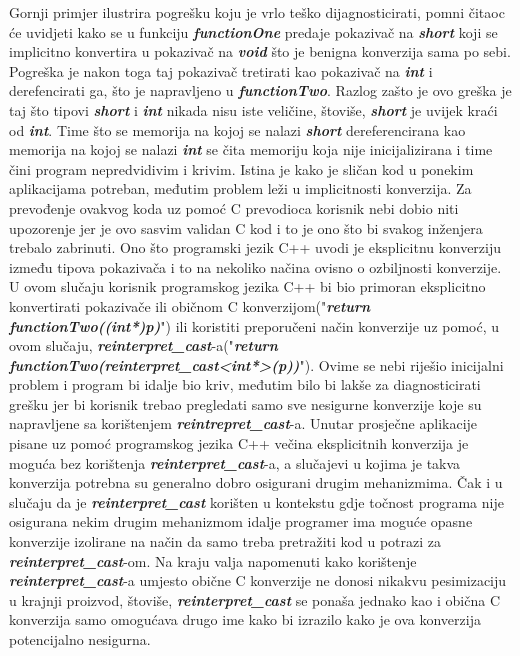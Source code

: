 Gornji primjer ilustrira pogrešku koju je vrlo teško dijagnosticirati, pomni čitaoc će uvidjeti kako se u funkciju \textbf{\textit{functionOne}} predaje pokazivač na \textbf{\textit{short}} koji se implicitno konvertira u pokazivač na \textbf{\textit{void}} što je benigna konverzija sama po sebi. Pogreška je nakon toga taj pokazivač tretirati kao pokazivač na \textbf{\textit{int}} i derefencirati ga, što je napravljeno u \textbf{\textit{functionTwo}}. Razlog zašto je ovo greška je taj što tipovi \textbf{\textit{short}} i \textbf{\textit{int}} nikada nisu iste veličine, štoviše, \textbf{\textit{short}} je uvijek kraći od \textbf{\textit{int}}. Time što se memorija na kojoj se nalazi \textbf{\textit{short}} dereferencirana kao memorija na kojoj se nalazi \textbf{\textit{int}} se čita memoriju koja nije inicijalizirana i time čini program nepredvidivim i krivim. Istina je kako je sličan kod u ponekim aplikacijama potreban, međutim problem leži u implicitnosti konverzija. Za prevođenje ovakvog koda uz pomoć C prevodioca korisnik nebi dobio niti upozorenje jer je ovo sasvim validan C kod i to je ono što bi svakog inženjera trebalo zabrinuti. Ono što programski jezik C++ uvodi je eksplicitnu konverziju između tipova pokazivača i to na nekoliko načina ovisno o ozbiljnosti konverzije. U ovom slučaju korisnik programskog jezika C++ bi bio primoran eksplicitno konvertirati pokazivače ili običnom C konverzijom("\textbf{\textit{return functionTwo((int*)p)}}") ili koristiti preporučeni način konverzije uz pomoć, u ovom slučaju, \textbf{\textit{reinterpret\_cast}}-a("\textbf{\textit{return functionTwo(reinterpret\_cast<int*>(p))}}"). Ovime se nebi riješio inicijalni problem i program bi idalje bio kriv, međutim bilo bi lakše za diagnosticirati grešku jer bi korisnik trebao pregledati samo sve nesigurne konverzije koje su napravljene sa korištenjem \textbf{\textit{reintrepret\_cast}}-a. Unutar prosječne aplikacije pisane uz pomoć programskog jezika C++ večina eksplicitnih konverzija je moguća bez korištenja \textbf{\textit{reinterpret\_cast}}-a, a slučajevi u kojima je takva konverzija potrebna su generalno dobro osigurani drugim mehanizmima. Čak i u slučaju da je \textbf{\textit{reinterpret\_cast}} korišten u kontekstu gdje točnost programa nije osigurana nekim drugim mehanizmom idalje programer ima moguće opasne konverzije izolirane na način da samo treba pretražiti kod u potrazi za \textbf{\textit{reinterpret\_cast}}-om. Na kraju valja napomenuti kako korištenje \textbf{\textit{reinterpret\_cast}}-a umjesto obične C konverzije ne donosi nikakvu pesimizaciju u krajnji proizvod, štoviše, \textbf{\textit{reinterpret\_cast}} se ponaša jednako kao i obična C konverzija samo omogućava drugo ime kako bi izrazilo kako je ova konverzija potencijalno nesigurna. 

